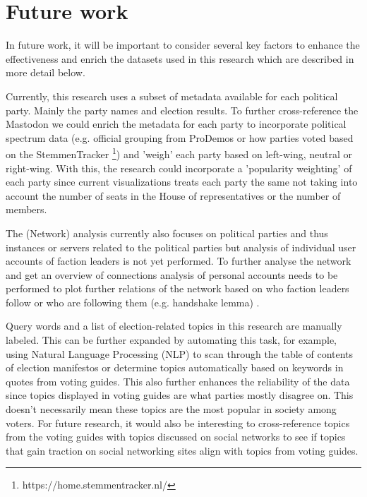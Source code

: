 \section{Future work}

In future work, it will be important to consider several key factors to enhance the effectiveness and enrich the datasets used in this research which are described in more detail below.

Currently, this research uses a subset of metadata available for each political party. Mainly the party names and election results. To further cross-reference the Mastodon we could enrich the metadata for each party to incorporate political spectrum data (e.g. official grouping from ProDemos or how parties voted based on the StemmenTracker \footnote{https://home.stemmentracker.nl/}) and 'weigh' each party based on left-wing, neutral or right-wing. With this, the research could incorporate a 'popularity weighting' of each party since current visualizations treats each party the same not taking into account the number of seats in the House of representatives or the number of members.

The (Network) analysis currently also focuses on political parties and thus instances or servers related to the political parties but analysis of individual user accounts of faction leaders is not yet performed. To further analyse the network and get an overview of connections analysis of personal accounts needs to be performed to plot further relations of the network based on who faction leaders follow or who are following them  (e.g. handshake lemma) \cite{handshake}.

Query words and a list of election-related topics in this research are manually labeled. This can be further expanded by automating this task, for example, using Natural Language Processing (NLP) to scan through the table of contents of election manifestos or determine topics automatically based on keywords in quotes from voting guides. This also further enhances the reliability of the data since topics displayed in voting guides are what parties mostly disagree on. This doesn't necessarily mean these topics are the most popular in society among voters. For future research, it would also be interesting to cross-reference topics from the voting guides with topics discussed on social networks to see if topics that gain traction on social networking sites align with topics from voting guides.